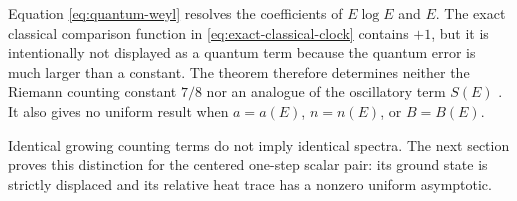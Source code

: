 \begin{remark}
\label{rem:mean-resolution}
Equation \eqref{eq:quantum-weyl} resolves the coefficients of \(E\log E\)
and \(E\).  The exact classical comparison function in
\cref{eq:exact-classical-clock} contains \(+1\), but it is intentionally not
displayed as a quantum term because the quantum error is much larger than a
constant.  The theorem therefore determines neither the Riemann counting
constant \(7/8\) nor an analogue of the oscillatory term \(S(E)\)
\citep{TitchmarshHeathBrown1986}.  It also gives no uniform result when
\(a=a(E)\), \(n=n(E)\), or \(B=B(E)\).
\end{remark}

Identical growing counting terms do not imply identical spectra.  The next
section proves this distinction for the centered one-step scalar pair: its
ground state is strictly displaced and its relative heat trace has a nonzero
uniform asymptotic.
